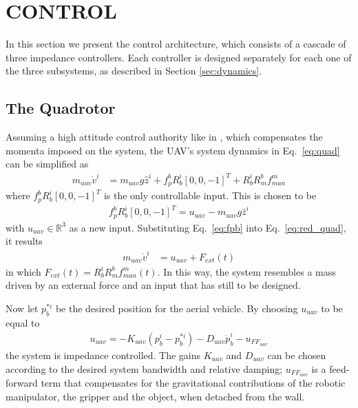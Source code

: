 \documentclass[a4paper, 10pt, conference]{ieeeconf}
\renewcommand{\cdot}{}  %
\begin{document}
\section{CONTROL}
\label{sec:control}
In this section we present the control architecture, which consists of a cascade of three impedance controllers. Each controller is designed separately for each one of the three subsystems, as described in Section \ref{sec:dynamics}. 


\subsection{The Quadrotor}
Assuming a high attitude control authority like in \cite{matteo}, which
compensates the momenta imposed on the system, the UAV's system dynamics
in Eq.~\ref{eq:quad} can be simplified as
\begin{align}
m_\textit{uav} \cdot \dot{v}^i &= m_\textit{uav} \cdot g \cdot \hat{z}^i + f_p^b \cdot R_b^i \cdot [0,0,-1]^T + R_b^i \cdot R_m^b \cdot f_\textit{man}^m
\label{eq:red_quad}
\end{align}
where $f_p^b \cdot R_b^i \cdot [0,0,-1]^T$ is the only controllable input. %
This is chosen to be
\begin{align}
  f_p^b \cdot R_b^i \cdot [0,0,-1]^T = u_\textit{uav} - m_\textit{uav} \cdot g
  \cdot \hat{z}^i
  \label{eq:fpb}
\end{align}
with $u_\textit{uav} \in \mathbb{R}^3$ as a new
input. Substituting Eq.~\ref{eq:fpb} into Eq.~\ref{eq:red_quad}, it results
\begin{align*}
m_\textit{uav} \cdot \dot{v}^i &= u_\textit{uav} + F_\textit{ext}(t)
\end{align*}
in which $F_\textit{ext}(t) = R_b^i \cdot R_m^b \cdot
f_\textit{man}^m(t)$. In this way, the system resembles a mass driven
by an external force and an input that has still to be designed.

Now let $p_b^{* i}$ be the desired position for the aerial vehicle. By
choosing $u_\textit{uav}$ to be equal to
\begin{align*}
u_\textit{uav} = -K_\textit{uav} (p_b^i-p_b^{* i}) - D_\textit{uav} \dot{p}_b^i - u_{{FF}_{uav}}
\end{align*}
the system is impedance controlled. The gains $K_\textit{uav}$ and $D_\textit{uav}$ can be
chosen according to the desired system bandwidth and relative
damping; $u_{{FF}_{uav}}$ is a feed-forward term that compensates for the gravitational contributions of the robotic manipulator, the gripper and the object, when detached from the wall.
\end{document}
